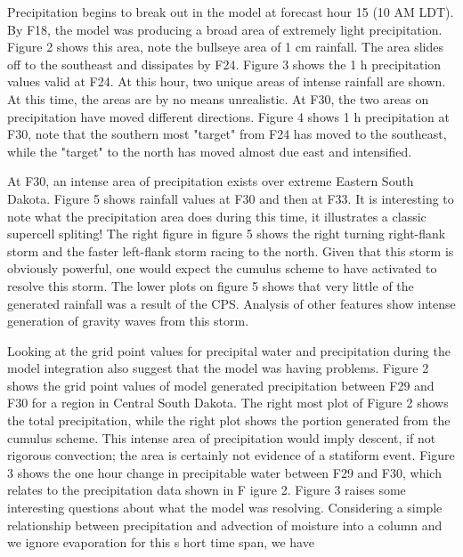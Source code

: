 \documentclass{article}
\begin{document}
\begin{multicols}{2}
Precipitation begins to break out in the model at forecast hour 15 (10 AM LDT).  By F18, the model was producing a broad area of extremely light precipitation.  Figure 2 shows this area, note the bullseye area of 1 cm \hr rainfall.  The area slides off to the southeast and dissipates by F24.  Figure 3 shows the 1 h precipitation values valid at F24.  At this hour, two unique areas of intense rainfall are shown.  At this time, the areas are by no means unrealistic.  At F30, the two areas on precipitation have moved different directions.  Figure 4 shows 1 h precipitation at F30, note that the southern most "target" from F24 has moved to the southeast, while the "target" to the north has moved almost due east and intensified.

At F30, an intense area of precipitation exists over extreme Eastern South Dakota.  Figure 5 shows rainfall values at F30 and then at F33.  It is interesting to note what the precipitation area does during this time, it illustrates a classic supercell spliting!  The right figure in figure 5 shows the right turning right-flank storm and the faster left-flank storm racing to the north.  Given that this storm is obviously powerful, one would expect the cumulus scheme to have activated to resolve this storm.  The lower plots on figure 5 shows that very little of the generated rainfall was a result of the CPS.  Analysis of other features show intense generation of gravity waves from this storm.

Looking at the grid point values for precipital water and precipitation during the model integration also suggest that the model was having problems.  Figure 2 shows the grid point values of model generated precipitation between F29 and F30 for a region in Central South Dakota.  The right most plot of Figure 2 shows the total precipitation, while the right plot shows the portion generated from the cumulus scheme.  This intense area of precipitation would imply descent, if not rigorous convection; the area is certainly not evidence of a statiform event.  Figure 3 shows the one hour change in precipitable water between F29 and F30, which relates to the precipitation data shown in F
igure 2.   Figure 3 raises some interesting questions about what the model was resolving.  Considering a simple relationship between precipitation and advection of moisture into a column and we ignore evaporation for this s
hort time span, we have


\end{multicols}
\end{document}
